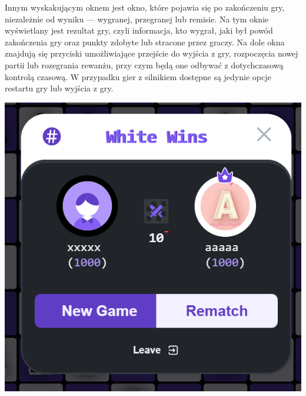 \documentclass[12pt,a4paper]{article}
\begin{document}
\begin{minipage}[t]{0.45\textwidth} 
    \vspace{0pt} 
    \raggedright 
    Innym wyskakującym oknem jest okno, które pojawia się po zakończeniu gry, niezależnie od wyniku — wygranej, przegranej lub remisie. Na tym oknie wyświetlany jest rezultat gry, czyli informacja, kto wygrał, jaki był powód zakończenia gry oraz punkty zdobyte lub stracone przez graczy. Na dole okna znajdują się przyciski umożliwiające przejście do wyjścia z gry, rozpoczęcia nowej partii lub rozegrania rewanżu, przy czym będą one odbywać z dotychczasową kontrolą czasową. W przypadku gier z silnikiem dostępne są jedynie opcje restartu gry lub wyjścia z gry.
\end{minipage} 
\hfill 
\begin{minipage}[t]{0.45\textwidth} 
    \vspace{0pt} 
    \centering 
    \includegraphics[width=\linewidth]{images/ins_min_win.png} 
\end{minipage}

\newpage
\end{document}
